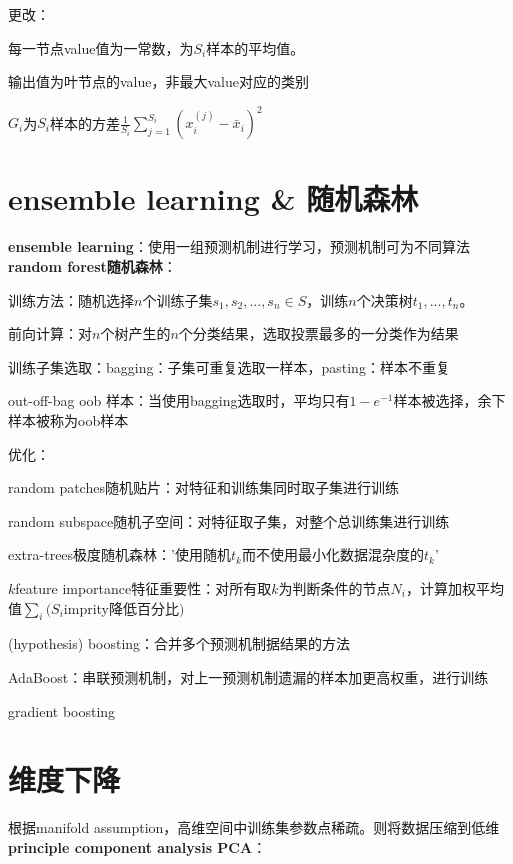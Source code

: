 \documentclass[UTF8]{ctexart}
\begin{document}
  更改：
  
  \quad 每一节点value值为一常数，为$S_i$样本的平均值。
  
  \quad 输出值为叶节点的value，非最大value对应的类别

  \quad $G_i$为$S_i$样本的方差$\frac{1}{S_i}\sum_{j=1}^{S_i}(x_i^{(j)} - \bar{x}_i)^2$

\section{ensemble learning \& 随机森林}
\noindent \textbf{ensemble learning}：使用一组预测机制进行学习，预测机制可为不同算法\\
\textbf{random forest随机森林}：

  训练方法：随机选择$n$个训练子集$s_1, s_2, ..., s_n \in S$，训练$n$个决策树$t_1, ..., t_n$。
  
  前向计算：对$n$个树产生的$n$个分类结果，选取投票最多的一分类作为结果
  
  训练子集选取：bagging：子集可重复选取一样本，pasting：样本不重复
  
  \quad out-off-bag oob 样本：当使用bagging选取时，平均只有$1-e^{-1}$样本被选择，余下样本被称为oob样本

  优化：

  \quad random patches随机贴片：对特征和训练集同时取子集进行训练
  
  \quad random subspace随机子空间：对特征取子集，对整个总训练集进行训练
  
  \quad extra-trees极度随机森林：'使用随机$t_k$而不使用最小化数据混杂度的$t_k$'
  
  \quad $k$feature importance特征重要性：对所有取$k$为判断条件的节点$N_i$，计算加权平均值$\sum_i(S_i$imprity降低百分比$)$
  
  \quad (hypothesis) boosting：合并多个预测机制据结果的方法
  
  \quad \quad AdaBoost：串联预测机制，对上一预测机制遗漏的样本加更高权重，进行训练

  \quad \quad gradient boosting


\section{维度下降}
\noindent 根据manifold assumption，高维空间中训练集参数点稀疏。则将数据压缩到低维\\
\textbf{principle component analysis PCA}：
\end{document}
